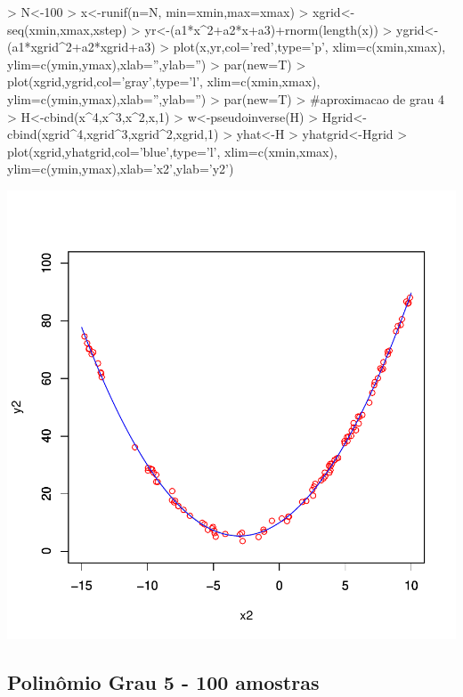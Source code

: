 \documentclass{article}
\begin{document}
\begin{Schunk}
\begin{Sinput}
>   N<-100
>   x<-runif(n=N, min=xmin,max=xmax)
>   xgrid<-seq(xmin,xmax,xstep)
>   yr<-(a1*x^2+a2*x+a3)+rnorm(length(x))
>   ygrid<-(a1*xgrid^2+a2*xgrid+a3)
>   plot(x,yr,col='red',type='p', xlim=c(xmin,xmax), ylim=c(ymin,ymax),xlab='',ylab='')
>   par(new=T)
>   plot(xgrid,ygrid,col='gray',type='l', xlim=c(xmin,xmax), ylim=c(ymin,ymax),xlab='',ylab='')
>   par(new=T)
>   #aproximacao de grau 4
>   H<-cbind(x^4,x^3,x^2,x,1)
>   w<-pseudoinverse(H) %
>   Hgrid<-cbind(xgrid^4,xgrid^3,xgrid^2,xgrid,1)
>   yhat<-H%
>   yhatgrid<-Hgrid%
>   plot(xgrid,yhatgrid,col='blue',type='l', xlim=c(xmin,xmax), ylim=c(ymin,ymax),xlab='x2',ylab='y2')
\end{Sinput}
\end{Schunk}
\includegraphics{aproximacao_polinomial-013}

\newpage
\subsection{Polinômio Grau 5 - 100 amostras}
\end{document}
